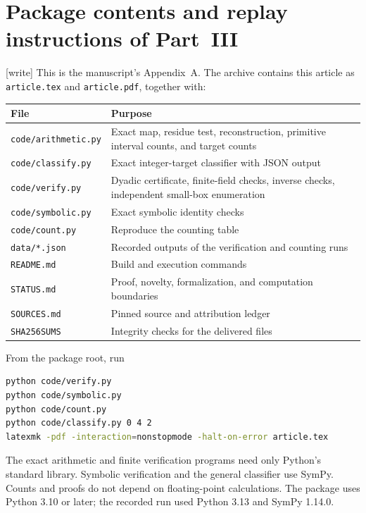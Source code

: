 \documentclass[11pt]{article}
\numberwithin{equation}{section}
\theoremstyle{plain}
\theoremstyle{plain}
\theoremstyle{plain}
\theoremstyle{definition}
\theoremstyle{definition}
\theoremstyle{definition}
\theoremstyle{remark}
\newcommand{\wtag}{\textup{[write]}}%
\newcommand{\rpath}[1]{\nolinkurl{#1}}
\begin{document}
\section{Package contents and replay instructions of Part~III}\label{alg:ns:app:package}
\wtag{} This is the manuscript's Appendix~A.
The archive contains this article as \rpath{article.tex} and
\rpath{article.pdf}, together with:
\begin{center}\small
\begin{tabular}{@{}p{}p{}@{}}
\toprule
File & Purpose\\
\midrule
\rpath{code/arithmetic.py} & Exact map, residue test, reconstruction,
primitive interval counts, and target counts\\
\rpath{code/classify.py} & Exact integer-target classifier with JSON output\\
\rpath{code/verify.py} & Dyadic certificate, finite-field checks, inverse
checks, independent small-box enumeration\\
\rpath{code/symbolic.py} & Exact symbolic identity checks\\
\rpath{code/count.py} & Reproduce the counting table\\
\rpath{data/*.json} & Recorded outputs of the verification and counting runs\\
\rpath{README.md} & Build and execution commands\\
\rpath{STATUS.md} & Proof, novelty, formalization, and computation boundaries\\
\rpath{SOURCES.md} & Pinned source and attribution ledger\\
\rpath{SHA256SUMS} & Integrity checks for the delivered files\\
\bottomrule
\end{tabular}
\end{center}
From the package root, run
\begin{lstlisting}[language=bash]
python code/verify.py
python code/symbolic.py
python code/count.py
python code/classify.py 0 4 2
latexmk -pdf -interaction=nonstopmode -halt-on-error article.tex
\end{lstlisting}
The exact arithmetic and finite verification programs need only Python's
standard library. Symbolic verification and the general classifier use
SymPy. Counts and proofs do not depend on floating-point calculations.
The package uses Python 3.10 or later; the recorded run used Python 3.13
and SymPy 1.14.0.
\end{document}
